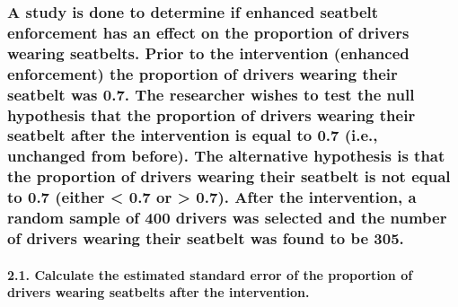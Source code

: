 \documentclass[
]{article}
\begin{document}
\hypertarget{a-study-is-done-to-determine-if-enhanced-seatbelt-enforcement-has-an-effect-on-the-proportion-of-drivers-wearing-seatbelts.-prior-to-the-intervention-enhanced-enforcement-the-proportion-of-drivers-wearing-their-seatbelt-was-0.7.-the-researcher-wishes-to-test-the-null-hypothesis-that-the-proportion-of-drivers-wearing-their-seatbelt-after-the-intervention-is-equal-to-0.7-i.e.-unchanged-from-before.-the-alternative-hypothesis-is-that-the-proportion-of-drivers-wearing-their-seatbelt-is-not-equal-to-0.7-either-0.7-or-0.7.-after-the-intervention-a-random-sample-of-400-drivers-was-selected-and-the-number-of-drivers-wearing-their-seatbelt-was-found-to-be-305.}{%
\subsubsection{A study is done to determine if enhanced seatbelt
enforcement has an effect on the proportion of drivers wearing
seatbelts. Prior to the intervention (enhanced enforcement) the
proportion of drivers wearing their seatbelt was 0.7. The researcher
wishes to test the null hypothesis that the proportion of drivers
wearing their seatbelt after the intervention is equal to 0.7 (i.e.,
unchanged from before). The alternative hypothesis is that the
proportion of drivers wearing their seatbelt is not equal to 0.7 (either
\textless{} 0.7 or \textgreater{} 0.7). After the intervention, a random
sample of 400 drivers was selected and the number of drivers wearing
their seatbelt was found to be
305.}\label{a-study-is-done-to-determine-if-enhanced-seatbelt-enforcement-has-an-effect-on-the-proportion-of-drivers-wearing-seatbelts.-prior-to-the-intervention-enhanced-enforcement-the-proportion-of-drivers-wearing-their-seatbelt-was-0.7.-the-researcher-wishes-to-test-the-null-hypothesis-that-the-proportion-of-drivers-wearing-their-seatbelt-after-the-intervention-is-equal-to-0.7-i.e.-unchanged-from-before.-the-alternative-hypothesis-is-that-the-proportion-of-drivers-wearing-their-seatbelt-is-not-equal-to-0.7-either-0.7-or-0.7.-after-the-intervention-a-random-sample-of-400-drivers-was-selected-and-the-number-of-drivers-wearing-their-seatbelt-was-found-to-be-305.}}

\hypertarget{calculate-the-estimated-standard-error-of-the-proportion-of-drivers-wearing-seatbelts-after-the-intervention.}{%
\paragraph{2.1. Calculate the estimated standard error of the proportion
of drivers wearing seatbelts after the
intervention.}\label{calculate-the-estimated-standard-error-of-the-proportion-of-drivers-wearing-seatbelts-after-the-intervention.}}
\end{document}

